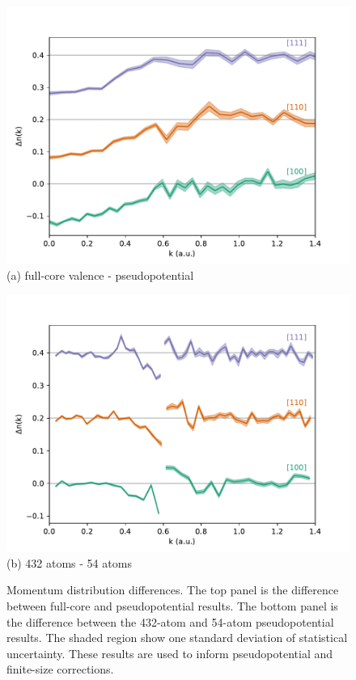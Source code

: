 \begin{figure}[h]
\begin{minipage}{0.49\columnwidth}
\centering
\includegraphics[width=\linewidth]{li57_dmcfc-ppc-dir}
(a) full-core valence - pseudopotential
\end{minipage}
\begin{minipage}{0.49\columnwidth}
\centering
\includegraphics[width=\linewidth]{li52g_bfd-crystal-n54-n432-dnk}
(b) 432 atoms - 54 atoms
\end{minipage}
\caption{Momentum distribution differences. The top panel is the difference between full-core and pseudopotential results. The bottom panel is the difference between the 432-atom and 54-atom pseudopotential results. The shaded region show one standard deviation of statistical uncertainty. These results are used to inform pseudopotential and finite-size corrections. \label{fig:dnk}}
\end{figure}

